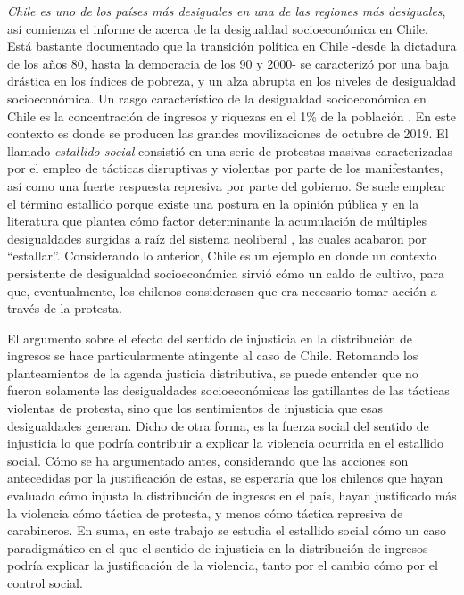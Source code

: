 \documentclass[12pt,twoside]{templates/facsothesis}
\begin{document}
\emph{Chile es uno de los países más desiguales en una de las regiones más desiguales}, así comienza el informe de \citet{PNUD2017} acerca de la desigualdad socioeconómica en Chile. Está bastante documentado que la transición política en Chile -desde la dictadura de los años 80, hasta la democracia de los 90 y 2000- se caracterizó por una baja drástica en los índices de pobreza, y un alza abrupta en los niveles de desigualdad socioeconómica. Un rasgo característico de la desigualdad socioeconómica en Chile es la concentración de ingresos y riquezas en el 1\% de la población \citep{PNUD2017}. En este contexto es donde se producen las grandes movilizaciones de octubre de 2019. El llamado \emph{estallido social} consistió en una serie de protestas masivas caracterizadas por el empleo de tácticas disruptivas y violentas por parte de los manifestantes, así como una fuerte respuesta represiva por parte del gobierno. Se suele emplear el término estallido porque existe una postura en la opinión pública y en la literatura que plantea cómo factor determinante la acumulación de múltiples desigualdades surgidas a raíz del sistema neoliberal \citep{Somma2020}, las cuales acabaron por ``estallar''. Considerando lo anterior, Chile es un ejemplo en donde un contexto persistente de desigualdad socioeconómica sirvió cómo un caldo de cultivo, para que, eventualmente, los chilenos considerasen que era necesario tomar acción a través de la protesta.

El argumento sobre el efecto del sentido de injusticia en la distribución de ingresos se hace particularmente atingente al caso de Chile. Retomando los planteamientos de la agenda justicia distributiva, se puede entender que no fueron solamente las desigualdades socioeconómicas las gatillantes de las tácticas violentas de protesta, sino que los sentimientos de injusticia que esas desigualdades generan. Dicho de otra forma, es la fuerza social del sentido de injusticia lo que podría contribuir a explicar la violencia ocurrida en el estallido social. Cómo se ha argumentado antes, considerando que las acciones son antecedidas por la justificación de estas, se esperaría que los chilenos que hayan evaluado cómo injusta la distribución de ingresos en el país, hayan justificado más la violencia cómo táctica de protesta, y menos cómo táctica represiva de carabineros. En suma, en este trabajo se estudia el estallido social cómo un caso paradigmático en el que el sentido de injusticia en la distribución de ingresos podría explicar la justificación de la violencia, tanto por el cambio cómo por el control social.
\end{document}

